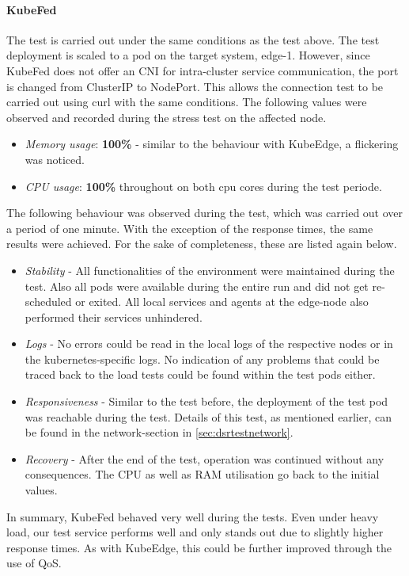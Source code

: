 \documentclass[MIC,Master,english]{twbook}%
\begin{document}
\paragraph{KubeFed} The test is carried out under the same conditions as the test above. The test deployment is scaled to a pod on the target system, edge-1. However, since KubeFed does not offer an \ac{CNI} for intra-cluster service communication, the port is changed from ClusterIP to NodePort. This allows the connection test to be carried out using curl with the same conditions. The following values were observed and recorded during the stress test on the affected node.

\begin{itemize}
    \item \textit{Memory usage}: \textbf{100\%} - similar to the behaviour with KubeEdge, a flickering was noticed.
    \item \textit{CPU usage}: \textbf{100\%} throughout on both cpu cores during the test periode. 
\end{itemize}

The following behaviour was observed during the test, which was carried out over a period of one minute. With the exception of the response times, the same results were achieved. For the sake of completeness, these are listed again below.

\begin{itemize} 
    \item \textit{Stability} - All functionalities of the environment were maintained during the test. Also all pods were available during the entire run and did not get re-scheduled or exited. All local services and agents at the edge-node also performed their services unhindered.
    \item \textit{Logs} - No errors could be read in the local logs of the respective nodes or in the kubernetes-specific logs. No indication of any problems that could be traced back to the load tests could be found within the test pods either.
    \item \textit{Responsiveness} - Similar to the test before, the deployment of the test pod was reachable during the test. Details of this test, as mentioned earlier, can be found in the network-section in \autoref{sec:dsrtestnetwork}.
    \item \textit{Recovery} - After the end of the test, operation was continued without any consequences. The CPU as well as RAM utilisation go back to the initial values. 
\end{itemize}
In summary, KubeFed behaved very well during the tests. Even under heavy load, our test service performs well and only stands out due to slightly higher response times. As with KubeEdge, this could be further improved through the use of \ac{QoS}.
\end{document}
